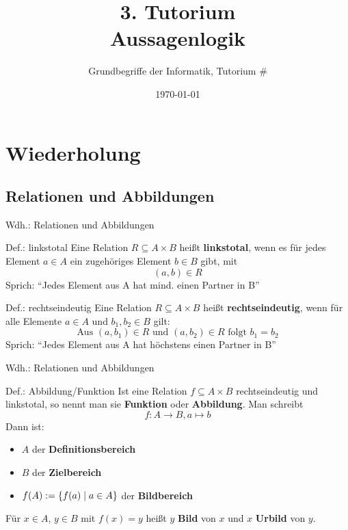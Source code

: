 



\title[Aussagenlogik]{3. Tutorium\\ Aussagenlogik}
\subtitle{Grundbegriffe der Informatik, Tutorium \#\mytutnumber}
\date{\today}

\usepackage{tikz}


\titleframe
\roadmap

\section{Wiederholung}
\subsection{Relationen und Abbildungen}
\begin{frame}{Wdh.: Relationen und Abbildungen}
	\begin{block}{Def.: linkstotal}
	\pause
		Eine Relation $R \subseteq A \times B$ heißt \textbf{linkstotal}, wenn es für jedes Element $a \in A$ ein zugehöriges Element $b \in B$ gibt, mit $$(a,b) \in R$$
		Sprich: \enquote{Jedes Element aus A hat mind. einen Partner in B}
	\end{block}
	\pause
	\begin{block}{Def.: rechtseindeutig}
	\pause
		Eine Relation $R \subseteq A \times B$ heißt \textbf{rechtseindeutig}, wenn für alle Elemente $a \in A$ und $b_1, b_2 \in B$ gilt: $$\text{Aus }(a,b_1) \in R \text{ und } (a,b_2) \in R \text{ folgt }  b_1 = b_2$$
		Sprich: \enquote{Jedes Element aus A hat höchstens einen Partner in B}
	\end{block}
\end{frame}

\begin{frame}{Wdh.: Relationen und Abbildungen}
	\begin{block}{Def.: Abbildung/Funktion}
		Ist eine Relation $f \subseteq A \times B$ rechtseindeutig und linkstotal, so nennt man sie \textbf{Funktion} oder \textbf{Abbildung}. 
		Man schreibt
		\[
			f : A \to B, a \mapsto b %
		\]
		\pause
		Dann ist:
		\begin{itemize}
			\item \(A\) der \textbf{Definitionsbereich}
			\item \(B\) der \textbf{Zielbereich}
			\item \(f(A) := \{ f(a) \mid a \in A \}\) der \textbf{Bildbereich}
		\end{itemize}
		Für \(x \in A\), \(y \in B\) mit \(f(x)=y\) heißt \(y\) \textbf{Bild} von \(x\) und \(x\) \textbf{Urbild} von \(y\).
	\end{block}
\end{frame}

